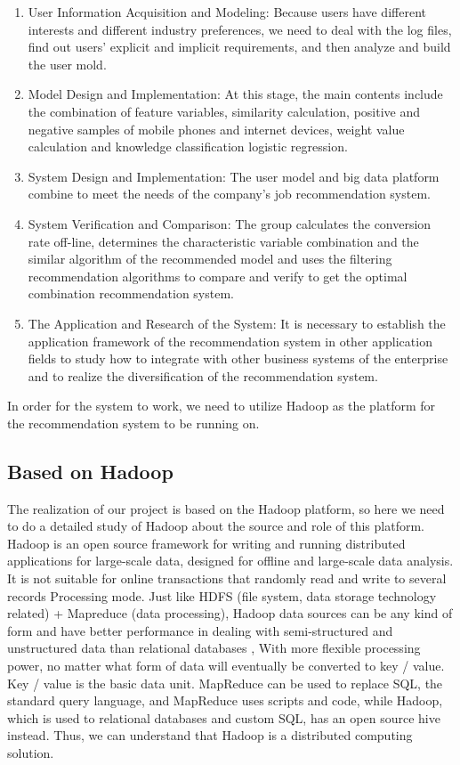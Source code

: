 \documentclass[sigconf]{acmart}
\begin{document}
\begin{enumerate}
  \item  User Information Acquisition and Modeling: Because users have different interests and different industry preferences, we need to deal with the log files, find out users' explicit and implicit requirements, and then analyze and build the user mold.
  \item Model Design and Implementation: At this stage, the main contents include the combination of feature variables, similarity calculation, positive and negative samples of mobile phones and internet devices, weight value calculation and knowledge classification logistic regression.
  \item System Design and Implementation: The user model and big data platform combine to meet the needs of the company's job recommendation system.
  \item System Verification and Comparison: The group calculates the conversion rate off-line, determines the characteristic variable combination and the similar algorithm of the recommended model and uses the filtering recommendation algorithms to compare and verify to get the optimal combination recommendation system.
  \item The Application and Research of the System: It is necessary to establish the application framework of the recommendation system in other application fields to study how to integrate with other business systems of the enterprise and to realize the diversification of the recommendation system.

\end{enumerate}

In order for the system to work, we need to utilize Hadoop as the platform for the recommendation system to be running on.

\subsection{Based on Hadoop}
The realization of our project is based on the Hadoop platform, so here we need to do a detailed study of Hadoop about the source and role of this platform. Hadoop is an open source framework for writing and running distributed applications for large-scale data, designed for offline and large-scale data analysis. It is not suitable for online transactions that randomly read and write to several records Processing mode. Just like HDFS (file system, data storage technology related) + Mapreduce (data processing), Hadoop data sources can be any kind of form and have better performance in dealing with semi-structured and unstructured data than relational databases , With more flexible processing power, no matter what form of data will eventually be converted to key / value. Key / value is the basic data unit. MapReduce can be used to replace SQL, the standard query language, and MapReduce uses scripts and code, while Hadoop, which is used to relational databases and custom SQL, has an open source hive instead. Thus, we can understand that Hadoop is a distributed computing solution.
\end{document}
